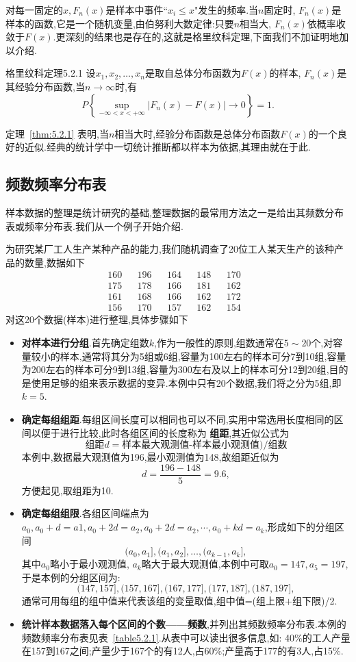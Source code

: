 对每一固定的$x,F_n(x)$是样本中事件``$x_i\leq x$"发生的频率.当$n$固定时, $F_n(x)$是样本的函数,它是一个随机变量,由伯努利大数定律:只要$n$相当大, $F_n(x)$依概率收敛于$F(x)$.更深刻的结果也是存在的,这就是格里纹科定理,下面我们不加证明地加以介绍.
\begin{theorem}{格里纹科定理}{5.2.1}
设$x_1,x_2,\dotsc,x_n$是取自总体分布函数为$F(x)$的样本, $F_n(x)$是其经验分布函数,当$n\to\infty$时,有
\[P\left\{\sup_{-\infty<x<+\infty}|F_n(x)-F(x)|\to0\right\}=1.\]
\end{theorem}

定理~\ref{thm:5.2.1} 表明,当$n$相当大时,经验分布函数是总体分布函数$F(x)$的一个良好的近似.经典的统计学中一切统计推断都以样本为依据,其理由就在于此.
\subsection{频数频率分布表\label{ssec:5.2.2}}
样本数据的整理是统计研究的基础,整理数据的最常用方法之一是给出其频数分布表或频率分布表.我们从一个例子开始介绍.
\begin{example}\label{exam:5.2.2}
为研究某厂工人生产某种产品的能力,我们随机调查了20位工人某天生产的该种产品的数量,数据如下
\begin{align*}
160&&196&&164&&148&&170&\\
175&&178&&166&&181&&162&\\
161&&168&&166&&162&&172&\\
156&&170&&157&&162&&154&
\end{align*}
对这20个数据(样本)进行整理,具体步骤如下
\begin{itemize}
\item  \textbf{对样本进行分组}.首先确定组数$k$,作为一般性的原则,组数通常在$5\sim20$个,对容量较小的样本,通常将其分为5组或6组,容量为100左右的样本可分7到10组,容量为200左右的样本可分9到13组,容量为300左右及以上的样本可分12到20组,目的是使用足够的组来表示数据的变异.本例中只有20个数据,我们将之分为5组,即$k=5$.
\item  \textbf{确定每组组距}.每组区间长度可以相同也可以不同,实用中常选用长度相同的区间以便于进行比较,此时各组区间的长度称为 \textbf{组距},其近似公式为
\[\text{组距}d=\text{样本最大观测值-样本最小观测值)}/\text{组数}\]
本例中,数据最大观测值为196,最小观测值为148,故组距近似为
\[d=\frac{196-148}5=9.6,\]
方便起见,取组距为10.
\item  \textbf{确定每组组限}.各组区间端点为$a_0,a_0+d=a1,a_0+2d=a_2,a_0+2d=a_2,\cdots,a_0+kd=a_k$,形成如下的分组区间
\[(a_0,a_1],(a_1,a_2],\dotsc,(a_{k-1},a_k],\]
其中$a_0$略小于最小观测值, $a_k$略大于最大观测值,本例中可取$a_0=147,a_5=197$,于是本例的分组区间为:
\[(147,157],(157,167],(167,177],(177,187],(187,197],\]
通常可用每组的组中值来代表该组的变量取值,组中值=(组上限$+$组下限)/2.
\item  \textbf{统计样本数据落入每个区间的个数——频数},并列出其频数频率分布表.本例的频数频率分布表见表~\ref{table5.2.1}.从表中可以读出很多信息,如: 40\%的工人产量在157到167之间;产量少于167个的有12人,占60\%;产量高于177的有3人,占15\%.
\end{itemize}
\end{example}
